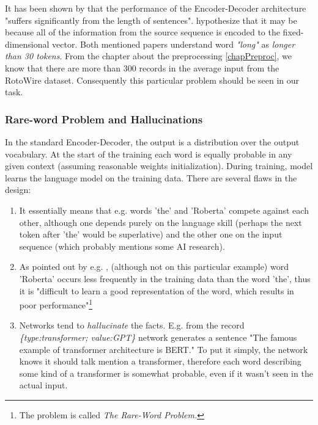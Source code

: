 It has been shown by \citep{cho2014properties} that the performance of the Encoder-Decoder architecture "suffers significantly from the length of sentences". \citep{bahdanau2016neural} hypothesize that it may be because all of the information from the source sequence is encoded to the fixed-dimensional vector. Both mentioned papers understand word \emph{"long"} as \emph{longer than 30 tokens}. From the chapter about the preprocessing \ref{chapPreproc}, we know that there are more than 300 records in the average input from the RotoWire dataset. Consequently this particular problem should be seen in our task. 

\subsubsection{Rare-word Problem and Hallucinations} \label{rare_word_problem}

In the standard Encoder-Decoder, the output is a distribution over the output vocabulary. At the start of the training each word is equally probable in any given context (assuming reasonable weights initialization). During training, model learns the language model on the training data. There are several flaws in the design:

\begin{enumerate}
    \item It essentially means that e.g. words 'the' and 'Roberta' compete against each other, although one depends purely on the language skill (perhaps the next token after 'the' would be superlative) and the other one on the input sequence (which probably mentions some AI research).
    \item As pointed out by e.g. \citep{gulcehre2016pointing}, (although not on this particular example) word 'Roberta' occurs less frequently in the training data than the word 'the', thus it is "difficult to learn a good representation of the word, which results in poor performance"\footnote{The problem is called \emph{The Rare-Word Problem.}}
    \item Networks tend to \emph{hallucinate} the facts. E.g. from the record \emph{\{type:transfor\-mer; value:GPT\}} network generates a sentence "The famous example of transformer architecture is BERT." To put it simply, the network knows it should talk mention a transformer, therefore each word describing some kind of a transformer is somewhat probable, even if it wasn't seen in the actual input.
\end{enumerate}

